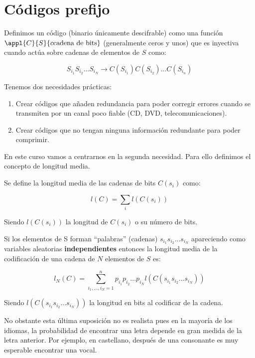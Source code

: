 \section{Códigos prefijo}

	\begin{defn}[Código]
		Definimos un código (binario únicamente descifrable) como una función $\appl{C}{S}{c\text{cadena de bits}}$ (generalmente ceros y unos) que es inyectiva cuando actúa sobre cadenas de elementos de $S$ como:

		$$ S_{i_1} S_{i_2} ... S_{i_N} \rightarrow C(S_{i_1}) C(S_{i_2}) ... C(S_{i_n}) $$

	\end{defn}

	Tenemos dos necesidades prácticas:

	\begin{enumerate}
		\item Crear códigos que añaden redundancia para poder corregir errores cuando se transmiten por un canal poco fiable (CD, DVD, telecomunicaciones).

		\item Crear códigos que no tengan ninguna información redundante para poder comprimir.
	\end{enumerate}

	En este curso vamos a centrarnos en la segunda necesidad. Para ello definimos el concepto de longitud media.

	\begin{defn}
		Se define la longitud media de las cadenas de bits $C(s_i)$ como:

		$$ l(C) = \sum_i l(C(s_i))$$

		Siendo $l(C(s_i))$ la longitud de $C(s_i)$ o su número de bits.
	\end{defn}

	Si los elementos de S forman ``palabras'' (cadenas) $s_{i_1} s_{i_2} ... s_{i_N}$ apareciendo como variables aleatorias \textbf{independientes} entonces la longitud media de la codificación de una cadena de $N$ elementos de $S$ es:

	$$l_{N}(C) = \sum_{i_1,...,i_N = 1}^{n} p_{i_1} p_{i_2} ... p_{i_N} l(C(s_{i_1} s_{i_2} ... s_{i_N}))$$

	Siendo $l(C(s_{i_1} s_{i_2} ... s_{i_N}))$ la longitud en bits al codificar de la cadena.

	No obstante esta última suposición no es realista pues en la mayoría de los idiomas, la probabilidad de encontrar una letra depende en gran medida de la letra anterior. Por ejemplo, en castellano, después de una consonante es muy esperable encontrar una vocal.

